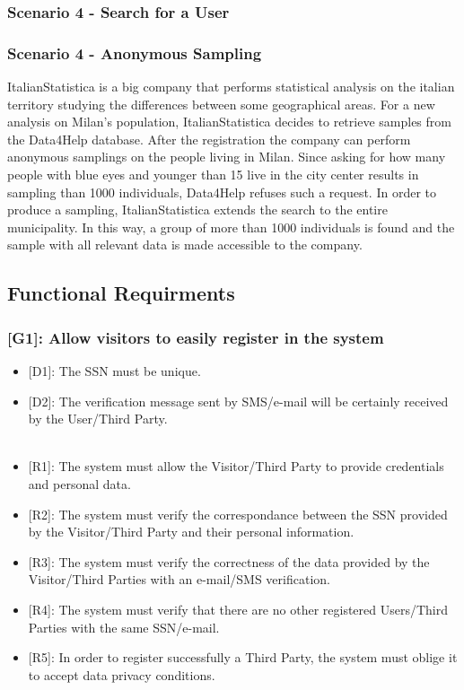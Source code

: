 \documentclass[12pt,a4paper]{article}
\begin{document}
			\subsubsection*{Scenario 4 - Search for a User}
				
			
			\subsubsection*{Scenario 4 - Anonymous Sampling}
				ItalianStatistica is a big company that performs statistical analysis on the italian territory studying the differences between some geographical areas. For a new analysis on Milan's population, ItalianStatistica decides to retrieve samples from the Data4Help database. After the registration the company can perform anonymous samplings on the people living in Milan. Since asking for how many people with blue eyes and younger than 15 live in the city center results in sampling than 1000 individuals, Data4Help refuses such a request. In order to produce a sampling, ItalianStatistica extends the search to the entire municipality. In this way, a group of more than 1000 individuals is found and the sample with all relevant data is made accessible to the company.
			
	\newpage
	
	\subsection{Functional Requirments}
		
		\subsubsection*{{[}{G1}{]}: Allow visitors to easily register in the system}
			\begin{itemize}
				\begin{itemize}
					\item {[D1]}: The SSN must be unique.
					\item {[D2]}: The verification message sent by SMS/e-mail will be certainly received by the User/Third Party.
					\\\\
					\item {[R1]}: The system must allow the Visitor/Third Party to provide credentials and personal data.
					\item {[R2]}: The system must verify the correspondance between the SSN provided by the Visitor/Third Party and their personal information.
					\item {[R3]}: The system must verify the correctness of the data provided by the Visitor/Third Parties with an e-mail/SMS verification.
					\item {[R4]}: The system must verify that there are no other registered Users/Third Parties with the same SSN/e-mail.
					\item {[R5]}: In order to register successfully a Third Party, the system must oblige it to accept data privacy conditions.
				\end{itemize} 
			\end{itemize}
\end{document}
